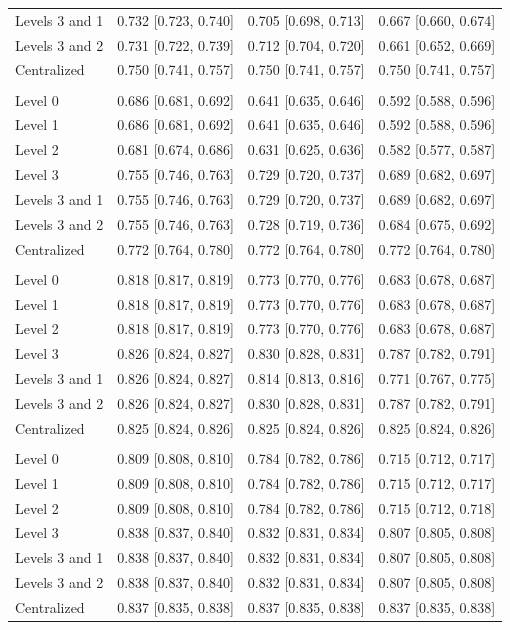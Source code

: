 \begin{tabular}{lccc}
Levels 3 and 1 & 0.732 [0.723, 0.740] & 0.705 [0.698, 0.713] & 0.667 [0.660, 0.674] \\
Levels 3 and 2 & 0.731 [0.722, 0.739] & 0.712 [0.704, 0.720] & 0.661 [0.652, 0.669] \\
Centralized & 0.750 [0.741, 0.757] & 0.750 [0.741, 0.757] & 0.750 [0.741, 0.757] \\
\addlinespace
\multicolumn{4}{@{}l}{\textit{Diabetic, XGBoost}} \\
Level 0 & 0.686 [0.681, 0.692] & 0.641 [0.635, 0.646] & 0.592 [0.588, 0.596] \\
Level 1 & 0.686 [0.681, 0.692] & 0.641 [0.635, 0.646] & 0.592 [0.588, 0.596] \\
Level 2 & 0.681 [0.674, 0.686] & 0.631 [0.625, 0.636] & 0.582 [0.577, 0.587] \\
Level 3 & 0.755 [0.746, 0.763] & 0.729 [0.720, 0.737] & 0.689 [0.682, 0.697] \\
Levels 3 and 1 & 0.755 [0.746, 0.763] & 0.729 [0.720, 0.737] & 0.689 [0.682, 0.697] \\
Levels 3 and 2 & 0.755 [0.746, 0.763] & 0.728 [0.719, 0.736] & 0.684 [0.675, 0.692] \\
Centralized & 0.772 [0.764, 0.780] & 0.772 [0.764, 0.780] & 0.772 [0.764, 0.780] \\
\addlinespace
\multicolumn{4}{@{}l}{\textit{Heart, Random Forest}} \\
Level 0 & 0.818 [0.817, 0.819] & 0.773 [0.770, 0.776] & 0.683 [0.678, 0.687] \\
Level 1 & 0.818 [0.817, 0.819] & 0.773 [0.770, 0.776] & 0.683 [0.678, 0.687] \\
Level 2 & 0.818 [0.817, 0.819] & 0.773 [0.770, 0.776] & 0.683 [0.678, 0.687] \\
Level 3 & 0.826 [0.824, 0.827] & 0.830 [0.828, 0.831] & 0.787 [0.782, 0.791] \\
Levels 3 and 1 & 0.826 [0.824, 0.827] & 0.814 [0.813, 0.816] & 0.771 [0.767, 0.775] \\
Levels 3 and 2 & 0.826 [0.824, 0.827] & 0.830 [0.828, 0.831] & 0.787 [0.782, 0.791] \\
Centralized & 0.825 [0.824, 0.826] & 0.825 [0.824, 0.826] & 0.825 [0.824, 0.826] \\
\addlinespace
\multicolumn{4}{@{}l}{\textit{Heart, XGBoost}} \\
Level 0 & 0.809 [0.808, 0.810] & 0.784 [0.782, 0.786] & 0.715 [0.712, 0.717] \\
Level 1 & 0.809 [0.808, 0.810] & 0.784 [0.782, 0.786] & 0.715 [0.712, 0.717] \\
Level 2 & 0.809 [0.808, 0.810] & 0.784 [0.782, 0.786] & 0.715 [0.712, 0.718] \\
Level 3 & 0.838 [0.837, 0.840] & 0.832 [0.831, 0.834] & 0.807 [0.805, 0.808] \\
Levels 3 and 1 & 0.838 [0.837, 0.840] & 0.832 [0.831, 0.834] & 0.807 [0.805, 0.808] \\
Levels 3 and 2 & 0.838 [0.837, 0.840] & 0.832 [0.831, 0.834] & 0.807 [0.805, 0.808] \\
Centralized & 0.837 [0.835, 0.838] & 0.837 [0.835, 0.838] & 0.837 [0.835, 0.838] \\
\bottomrule
\end{tabular}
